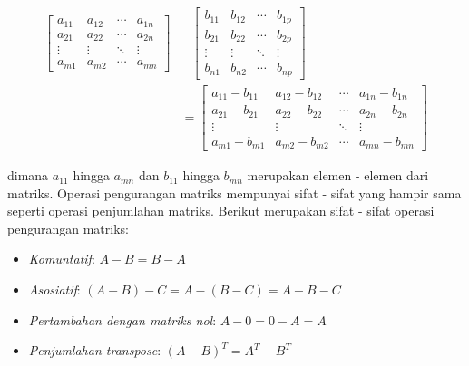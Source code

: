 \begin{align} \label{eq:matrix_substraction}
  \begin{bmatrix}
    a_{11} & a_{12} & \cdots & a_{1n} \\
    a_{21} & a_{22} & \cdots & a_{2n} \\
    \vdots & \vdots & \ddots & \vdots \\
    a_{m1} & a_{m2} & \cdots & a_{mn}
  \end{bmatrix}
   & -
  \begin{bmatrix}
    b_{11} & b_{12} & \cdots & b_{1p} \\
    b_{21} & b_{22} & \cdots & b_{2p} \\
    \vdots & \vdots & \ddots & \vdots \\
    b_{n1} & b_{n2} & \cdots & b_{np}
  \end{bmatrix}
  \nonumber \\
   & =
  \begin{bmatrix}
    a_{11} - b_{11} & a_{12} - b_{12} & \cdots & a_{1n} - b_{1n} \\
    a_{21} - b_{21} & a_{22} - b_{22} & \cdots & a_{2n} - b_{2n} \\
    \vdots          & \vdots          & \ddots & \vdots          \\
    a_{m1} - b_{m1} & a_{m2} - b_{m2} & \cdots & a_{mn} - b_{mn}
  \end{bmatrix}
\end{align}

\noindent
dimana $a_{11}$ hingga $a_{mn}$ dan $b_{11}$ hingga $b_{mn}$ merupakan elemen - elemen dari matriks. Operasi
pengurangan matriks mempunyai sifat - sifat yang hampir sama seperti operasi
penjumlahan matriks. Berikut merupakan sifat - sifat operasi pengurangan matriks:

\begin{itemize}
  \label{property_substraction_matrix}

  \item \emph{Komuntatif}: $A - B = B - A$

  \item \emph{Asosiatif}: $(A - B) - C = A - (B - C) = A - B - C$

  \item \emph{Pertambahan dengan matriks nol}: $A - 0 = 0 - A = A$

  \item \emph{Penjumlahan transpose}: $(A - B)^{T}= A^{T}- B^{T}$
\end{itemize}

